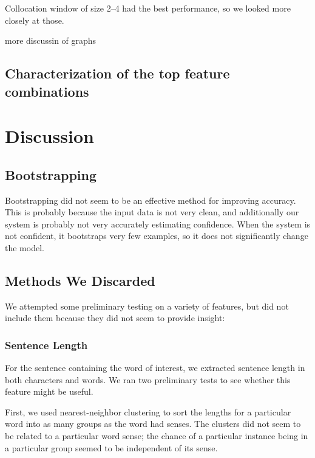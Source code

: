 \documentclass{article}
\begin{document}

Collocation window of size 2--4 had the best performance, so we looked more closely at those.


more discussin of graphs


\subsection{Characterization of the top feature combinations}


\section{Discussion}

\subsection{Bootstrapping}

Bootstrapping did not seem to be an effective method for improving accuracy.  This is probably because the input data is not very clean, and additionally our system is probably not very accurately estimating confidence.  When the system is not confident, it bootstraps very few examples, so it does not significantly change the model.

\subsection{Methods We Discarded}

We attempted some preliminary testing on a variety of features, but did not include them because they did not seem to provide insight:

\subsubsection{Sentence Length}
For the sentence containing the word of interest, we extracted sentence length in both characters and words. We ran two preliminary tests to see whether this feature might be useful.

First, we used nearest-neighbor clustering to sort the lengths for a particular word into as many groups as the word had senses. The clusters did not seem to be related to a particular word sense; the chance of a particular instance being in a particular group seemed to be independent of its sense.
\end{document}

